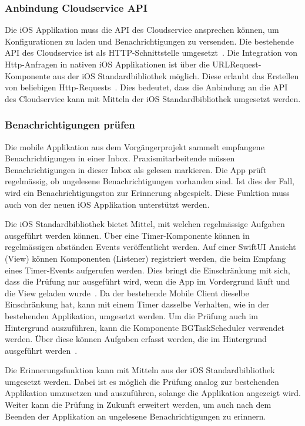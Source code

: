 \subsubsection{Anbindung Cloudservice API}

Die iOS Applikation muss die API des Cloudservice ansprechen können, um Konfigurationen zu laden und Benachrichtigungen zu versenden.
Die bestehende API des Cloudservice ist als HTTP-Schnittstelle umgesetzt~\cite{ip5}.
Die Integration von Http-Anfragen in nativen iOS Applikationen ist über die URLRequest-Komponente aus der iOS Standardbibliothek möglich.
Diese erlaubt das Erstellen von beliebigen Http-Requests~\cite{ios_urlrequest}.
Dies bedeutet, dass die Anbindung an die API des Cloudservice kann mit Mitteln der iOS Standardbibliothek umgesetzt werden.

\subsubsection{Benachrichtigungen prüfen}

Die mobile Applikation aus dem Vorgängerprojekt sammelt empfangene Benachrichtigungen in einer Inbox.
Praxismitarbeitende müssen Benachrichtigungen in dieser Inbox als gelesen markieren.
Die App prüft regelmässig, ob ungelesene Benachrichtigungen vorhanden sind.
Ist dies der Fall, wird ein Benachrichtigungston zur Erinnerung abgespielt.
Diese Funktion muss auch von der neuen iOS Applikation unterstützt werden.

Die iOS Standardbibliothek bietet Mittel, mit welchen regelmässige Aufgaben ausgeführt werden können.
Über eine Timer-Komponente können in regelmässigen abständen Events veröffentlicht werden.
Auf einer SwiftUI Ansicht (View) können Komponenten (Listener) registriert werden, die beim Empfang eines Timer-Events aufgerufen werden.
Dies bringt die Einschränkung mit sich, dass die Prüfung nur ausgeführt wird, wenn die App im Vordergrund läuft und die View geladen wurde~\cite{ios_timer}.
Da der bestehende Mobile Client dieselbe Einschränkung hat, kann mit einem Timer dasselbe Verhalten, wie in der bestehenden Applikation, umgesetzt werden.
Um die Prüfung auch im Hintergrund auszuführen, kann die Komponente BGTaskScheduler verwendet werden.
Über diese können Aufgaben erfasst werden, die im Hintergrund ausgeführt werden~\cite{ios_bgtaskscheduler}.

Die Erinnerungsfunktion kann mit Mitteln aus der iOS Standardbibliothek umgesetzt werden.
Dabei ist es möglich die Prüfung analog zur bestehenden Applikation umzusetzen und auszuführen, solange die Applikation angezeigt wird.
Weiter kann die Prüfung in Zukunft erweitert werden, um auch nach dem Beenden der Applikation an ungelesene Benachrichtigungen zu erinnern.

